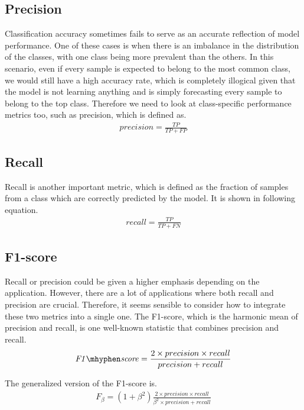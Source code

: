 \subsection{Precision}
\hspace{0.5cm}Classification accuracy sometimes fails to serve as an accurate reflection of model performance. One of these cases is when there is an imbalance in the distribution of the classes, with one class being more prevalent than the others. In this scenario, even if every sample is expected to belong to the most common class, we would still have a high accuracy rate, which is completely illogical given that the model is not learning anything and is simply forecasting every sample to belong to the top class. Therefore we need to look at class-specific performance metrics too, such as precision, which is defined as.
\begin{align*}
	precision = \frac{TP}{TP + FP}
\end{align*}

\subsection{Recall}
\hspace{0.5cm}Recall is another important metric, which is defined as the fraction of samples from a class which are correctly predicted by the model. It is shown in following equation.
\begin{align*}
	recall = \frac{TP}{TP + FN}
\end{align*}

\subsection{F1-score}
\hspace{0.5cm}Recall or precision could be given a higher emphasis depending on the application. However, there are a lot of applications where both recall and precision are crucial. Therefore, it seems sensible to consider how to integrate these two metrics into a single one. The F1-score, which is the harmonic mean of precision and recall, is one well-known statistic that combines precision and recall.
\begin{align*}
	\mathit{F1\mhyphen score} = \frac{2 \times precision \times recall}{precision + recall}
\end{align*}

The generalized version of the F1-score is.
\begin{align*}
	F_\beta = \left(1 + \beta^2 \right)\frac{2 \times precision \times recall}{\beta^2 \times precision + recall}
\end{align*}

